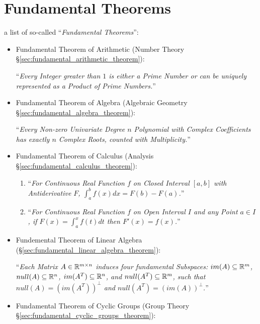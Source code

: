\section{Fundamental Theorems}\label{sec:fundamental_theorems}

a list of so-called ``\emph{Fundamental Theorems}'':
\begin{itemize}

  \item Fundamental Theorem of Arithmetic
    (Number Theory \S\ref{sec:fundamental_arithmetic_theorem}):

    ``\emph{Every Integer greater than $1$ is either a Prime Number or can be
      uniquely represented as a Product of Prime Numbers.}''

  \item Fundamental Theorem of Algebra
    (Algebraic Geometry \S\ref{sec:fundamental_algebra_theorem}):

    ``\emph{Every Non-zero Univariate Degree $n$ Polynomial with Complex
    Coefficients has exactly $n$ Complex Roots, counted with Multiplicity.}''

  \item Fundamental Theorem of Calculus
    (Analysis \S\ref{sec:fundamental_calculus_theorem}):

    \begin{enumerate}
      \item ``\emph{For Continuous Real Function $f$ on Closed Interval $[a,b]$
        with Antiderivative $F$, $\int_a^b f(x) dx = F(b) - F(a)$.}''
      \item ``\emph{For Continuous Real Function $f$ on Open Interval $I$
        and any Point $a \in I$, if $F(x) = \int_a^x f(t) dt$ then
        $F'(x) = f(x)$.}''
    \end{enumerate}
  \item Fundemental Theorem of Linear Algebra
    (\S\ref{sec:fundamental_linear_algebra_theorem}):

    ``\emph{Each Matrix $A \in \mathbb{R}^{m \times n}$ induces four fundamental
    Subspaces: $im(A) \subseteq \mathbb{R}^m$, $null(A) \subseteq \mathbb{R}^n$,
    $im(A^T) \subseteq \mathbb{R}^n$, and $null(A^T) \subseteq \mathbb{R}^m$, such that
    $null(A) = (im(A^T))^\bot$ and $null(A^T) = (im(A))^\bot$.}''

  \item Fundamental Theorem of Cyclic Groups
    (Group Theory \S\ref{sec:fundamental_cyclic_groups_theorem}):


\end{itemize}
